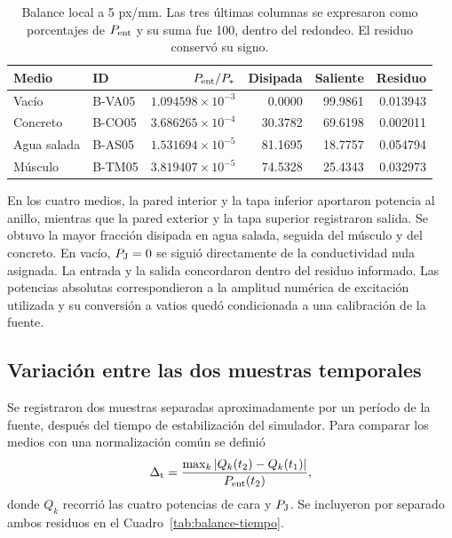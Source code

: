 \begin{table}[htbp]\centering\small
\caption{Balance local a 5 px/mm. Las tres últimas columnas se expresaron como porcentajes de $P_{\rm ent}$ y su suma fue 100, dentro del redondeo. El residuo conservó su signo.}\label{tab:balance-medios}
\begin{tabular}{llrrrr}\hline
Medio & ID & $P_{\rm ent}/P_*$ & Disipada & Saliente & Residuo \\ \hline
Vacío & B-VA05 & $1.094598\!\times\!10^{-3}$ & 0.0000 & 99.9861 & 0.013943 \\
Concreto & B-CO05 & $3.686265\!\times\!10^{-4}$ & 30.3782 & 69.6198 & 0.002011 \\
Agua salada & B-AS05 & $1.531694\!\times\!10^{-5}$ & 81.1695 & 18.7757 & 0.054794 \\
Músculo & B-TM05 & $3.819407\!\times\!10^{-5}$ & 74.5328 & 25.4343 & 0.032973 \\ \hline
\end{tabular}\end{table}

En los cuatro medios, la pared interior y la tapa inferior aportaron potencia al anillo, mientras que la pared exterior y la tapa superior registraron salida. Se obtuvo la mayor fracción disipada en agua salada, seguida del músculo y del concreto. En vacío, $P_{\rm J}=0$ se siguió directamente de la conductividad nula asignada. La entrada y la salida concordaron dentro del residuo informado. Las potencias absolutas correspondieron a la amplitud numérica de excitación utilizada y su conversión a vatios quedó condicionada a una calibración de la fuente.

\subsection{Variación entre las dos muestras temporales}
Se registraron dos muestras separadas aproximadamente por un período de la fuente, después del tiempo de estabilización del simulador. Para comparar los medios con una normalización común se definió
\begin{equation}
 \Delta_{\rm t}=\frac{\max_k|Q_k(t_2)-Q_k(t_1)|}{P_{\rm ent}(t_2)},
 \label{eq:variacion-temporal}
\end{equation}
donde $Q_k$ recorrió las cuatro potencias de cara y $P_{\rm J}$. Se incluyeron por separado ambos residuos en el Cuadro~\ref{tab:balance-tiempo}.

